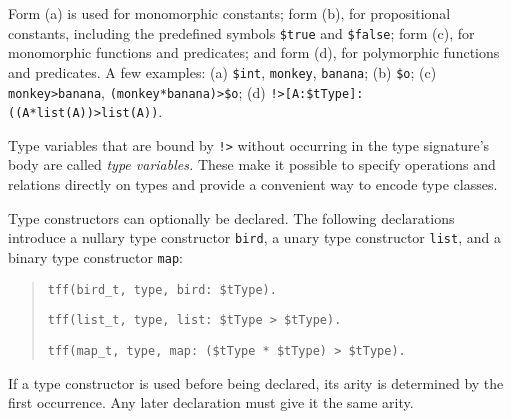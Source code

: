 Form (a) is used for monomorphic constants; form (b), for
propositional constants, including the predefined symbols {\tt \$true} and
{\tt \$false}; form (c), for monomorphic functions and predicates;
and form (d), for polymorphic functions and predicates.
A few examples:\enskip
(a) {\tt \$int}, {\tt monkey}, {\tt banana};\enskip
(b) {\tt \$o};\enskip
(c) {\tt monkey\;>\allowbreak\;banana},
    {\tt (monkey\;*\;banana)\allowbreak\;>\allowbreak\;\$o};\enskip
(d) {\tt !>[A\;:\;\$tType]:\;((A\;*\;list(A))\;>\;list(A))}.



Type variables that are bound by {\tt !>} without
occurring in the type signature's body are called \emph{\theghost{} type variables.}
These make it possible to specify operations and relations directly on types and
provide a convenient way to encode type classes.


 Type constructors
can optionally be declared.
The following declarations introduce a nullary type
constructor {\tt bird}, a unary type constructor {\tt list},
and a binary type constructor {\tt map}:
\begin{quote}
\verb+tff(bird_t, type, bird: $tType).+
\par
\verb+tff(list_t, type, list: $tType > $tType).+
\par
\verb+tff(map_t, type, map: ($tType * $tType) > $tType).+
\end{quote}
If a type constructor is used before being declared, its arity is
determined by the first occurrence. Any later declaration
must give it the same arity.

